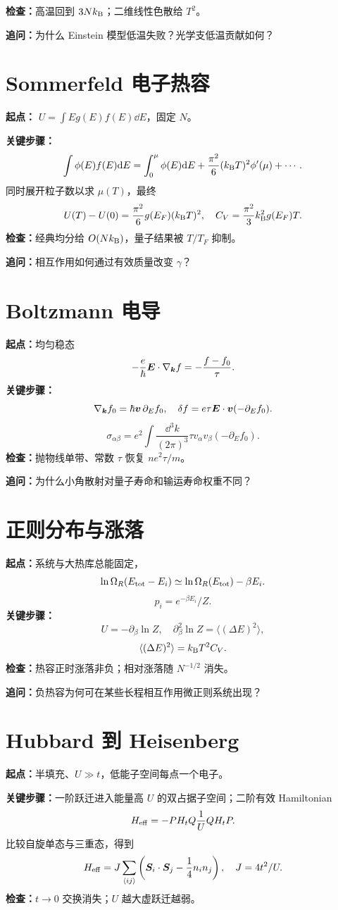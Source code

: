 \textbf{检查：}高温回到 $3Nk_{\mathrm B}$；二维线性色散给 $T^2$。

\textbf{追问：}为什么 Einstein 模型低温失败？光学支低温贡献如何？

\section{Sommerfeld 电子热容}
\textbf{起点：}
$U=\int Eg(E)f(E)\dd E$，固定 $N$。

\textbf{关键步骤：}
\[
\int\phi(E)f(E)\mathrm d E
=\int_0^\mu\phi(E)\mathrm d E
+\frac{\pi^2}{6}(k_{\mathrm B} T)^2\phi'(\mu)+\cdots.
\]
同时展开粒子数以求 $\mu(T)$，最终
\[
U(T)-U(0)=\frac{\pi^2}{6}g(E_F)(k_{\mathrm B} T)^2,\quad
C_V=\frac{\pi^2}{3}k_{\mathrm B}^2g(E_F)T.
\]
\textbf{检查：}经典均分给 $O(Nk_{\mathrm B})$，量子结果被
$T/T_F$ 抑制。

\textbf{追问：}相互作用如何通过有效质量改变 $\gamma$？

\section{Boltzmann 电导}
\textbf{起点：}均匀稳态
\[
-\frac e\hbar\bm{E}\cdot\nabla_{\bm{k}}f
=-\frac{f-f_0}{\tau}.
\]
\textbf{关键步骤：}
\[
\nabla_{\bm{k}}f_0=\hbar\bm{v}\,\partial_Ef_0,\quad
\delta f=e\tau\bm{E}\cdot\bm{v}(-\partial_Ef_0).
\]
\[
\sigma_{\alpha\beta}=e^2\int\frac{\dd^3k}{(2\pi)^3}
\tau v_\alpha v_\beta(-\partial_Ef_0).
\]
\textbf{检查：}抛物线单带、常数 $\tau$ 恢复
$ne^2\tau/m$。

\textbf{追问：}为什么小角散射对量子寿命和输运寿命权重不同？

\section{正则分布与涨落}
\textbf{起点：}系统与大热库总能固定，
\[
\ln\Omega_R(E_{\rm tot}-E_i)
\simeq\ln\Omega_R(E_{\rm tot})-\beta E_i.
\]
\[
p_i=e^{-\beta E_i}/Z.
\]
\textbf{关键步骤：}
\[
U=-\partial_\beta\ln Z,\quad
\partial_\beta^2\ln Z=\langle(\Delta E)^2\rangle,
\]
\[
\langle(\Delta E)^2\rangle=k_{\mathrm B} T^2C_V.
\]
\textbf{检查：}热容正时涨落非负；相对涨落随 $N^{-1/2}$ 消失。

\textbf{追问：}负热容为何可在某些长程相互作用微正则系统出现？

\section{Hubbard 到 Heisenberg}
\textbf{起点：}半填充、$U\gg t$，低能子空间每点一个电子。

\textbf{关键步骤：}一阶跃迁进入能量高 $U$ 的双占据子空间；二阶有效 Hamiltonian
\[
H_{\rm eff}=-P H_tQ\frac1UQH_tP.
\]
比较自旋单态与三重态，得到
\[
H_{\rm eff}=J\sum_{\langle ij\rangle}
\left(\bm{S}_i\cdot\bm{S}_j-\frac14n_in_j\right),
\quad J=4t^2/U.
\]
\textbf{检查：}$t\to0$ 交换消失；$U$ 越大虚跃迁越弱。

